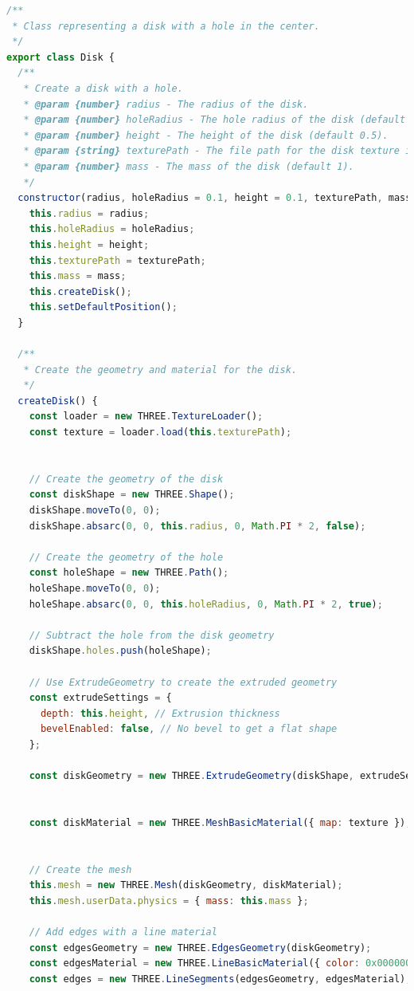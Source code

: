 \documentclass{article}
\begin{document}
\begin{lstlisting}[language=JavaScript, caption={JS Class for Disks}]
/**
 * Class representing a disk with a hole in the center.
 */
export class Disk {
  /**
   * Create a disk with a hole.
   * @param {number} radius - The radius of the disk.
   * @param {number} holeRadius - The hole radius of the disk (default 0.5).
   * @param {number} height - The height of the disk (default 0.5).
   * @param {string} texturePath - The file path for the disk texture image.
   * @param {number} mass - The mass of the disk (default 1).
   */
  constructor(radius, holeRadius = 0.1, height = 0.1, texturePath, mass = 1) {
    this.radius = radius;
    this.holeRadius = holeRadius;
    this.height = height;
    this.texturePath = texturePath;
    this.mass = mass;
    this.createDisk();
    this.setDefaultPosition();
  }

  /**
   * Create the geometry and material for the disk.
   */
  createDisk() {
    const loader = new THREE.TextureLoader();
    const texture = loader.load(this.texturePath);


    // Create the geometry of the disk
    const diskShape = new THREE.Shape();
    diskShape.moveTo(0, 0);
    diskShape.absarc(0, 0, this.radius, 0, Math.PI * 2, false);

    // Create the geometry of the hole
    const holeShape = new THREE.Path();
    holeShape.moveTo(0, 0);
    holeShape.absarc(0, 0, this.holeRadius, 0, Math.PI * 2, true);

    // Subtract the hole from the disk geometry
    diskShape.holes.push(holeShape);

    // Use ExtrudeGeometry to create the extruded geometry
    const extrudeSettings = {
      depth: this.height, // Extrusion thickness
      bevelEnabled: false, // No bevel to get a flat shape
    };

    const diskGeometry = new THREE.ExtrudeGeometry(diskShape, extrudeSettings);


    const diskMaterial = new THREE.MeshBasicMaterial({ map: texture });
    

    // Create the mesh
    this.mesh = new THREE.Mesh(diskGeometry, diskMaterial);
    this.mesh.userData.physics = { mass: this.mass };

    // Add edges with a line material
    const edgesGeometry = new THREE.EdgesGeometry(diskGeometry);
    const edgesMaterial = new THREE.LineBasicMaterial({ color: 0x000000 });
    const edges = new THREE.LineSegments(edgesGeometry, edgesMaterial);


\end{lstlisting}
\end{document}
